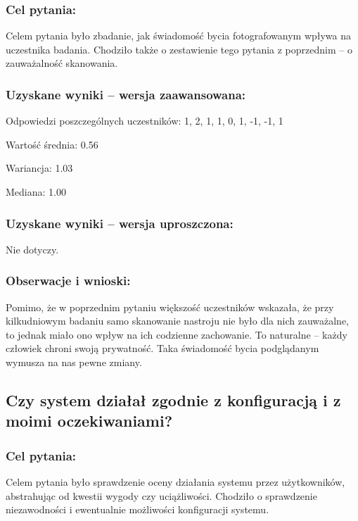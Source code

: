	\subsubsection{Cel pytania:}
	
	Celem pytania było zbadanie, jak świadomość bycia fotografowanym wpływa na uczestnika badania. Chodziło także o zestawienie tego pytania z poprzednim -- o zauważalność skanowania.
	
	\subsubsection{Uzyskane wyniki -- wersja zaawansowana:}
	
	Odpowiedzi poszczególnych uczestników: 1, 2, 1, 1, 0, 1, -1, -1, 1
	
	Wartość średnia: 0.56
	
	Wariancja: 1.03
	
	Mediana: 1.00
	
	\subsubsection{Uzyskane wyniki -- wersja uproszczona:}
	
	Nie dotyczy.
	
	\subsubsection{Obserwacje i wnioski:}
	
	Pomimo, że w poprzednim pytaniu większość uczestników wskazała, że przy kilkudniowym badaniu samo skanowanie nastroju nie było dla nich zauważalne, to jednak miało ono wpływ na ich codzienne zachowanie. To naturalne -- każdy człowiek chroni swoją prywatność. Taka świadomość bycia podglądanym wymusza na nas pewne zmiany.
	
	
\subsection{Czy system działał zgodnie z konfiguracją i z moimi oczekiwaniami?}
	
	\subsubsection{Cel pytania:}
	
	Celem pytania było sprawdzenie oceny działania systemu przez użytkowników, abstrahując od kwestii wygody czy uciążliwości. Chodziło o sprawdzenie niezawodności i ewentualnie możliwości konfiguracji systemu.
	
